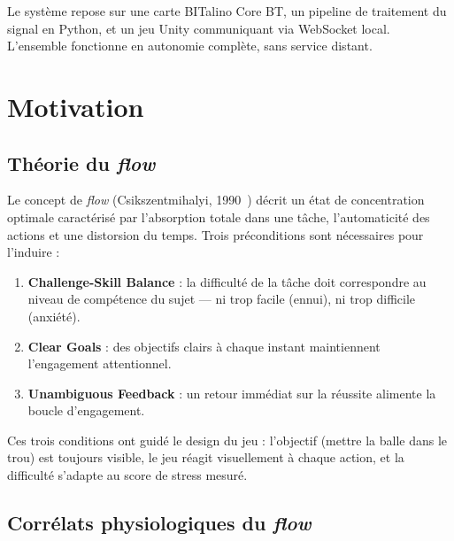 \documentclass[runningheads]{llncs}
\begin{document}
Le système repose sur une carte BITalino Core BT, un pipeline de traitement
du signal en Python, et un jeu Unity communiquant via WebSocket local.
L'ensemble fonctionne en autonomie complète, sans service distant.

\section{Motivation}

\subsection{Théorie du \textit{flow}}

Le concept de \textit{flow} (Csikszentmihalyi, 1990~\cite{csikszentmihalyi1990})
décrit un état de concentration optimale caractérisé par l'absorption totale
dans une tâche, l'automaticité des actions et une distorsion du temps. Trois
préconditions sont nécessaires pour l'induire :

\begin{enumerate}
  \item \textbf{Challenge-Skill Balance} : la difficulté de la tâche doit correspondre au niveau de compétence du sujet — ni trop facile (ennui), ni trop difficile (anxiété).
  \item \textbf{Clear Goals} : des objectifs clairs à chaque instant maintiennent l'engagement attentionnel.
  \item \textbf{Unambiguous Feedback} : un retour immédiat sur la réussite alimente la boucle d'engagement.
\end{enumerate}

Ces trois conditions ont guidé le design du jeu : l'objectif (mettre la balle
dans le trou) est toujours visible, le jeu réagit visuellement à chaque action,
et la difficulté s'adapte au score de stress mesuré.

\subsection{Corrélats physiologiques du \textit{flow}}
\end{document}

